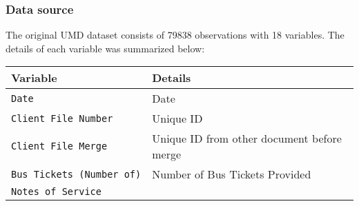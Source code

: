 \documentclass[]{article}
\begin{document}
\hypertarget{data-source}{%
\subsubsection{Data source}\label{data-source}}

The original UMD dataset consists of 79838 observations with 18
variables. The details of each variable was summarized below:

\begin{longtable}[]{@{}ll@{}}
\toprule
\begin{minipage}[b]{0.29\columnwidth}\raggedright
Variable\strut
\end{minipage} & \begin{minipage}[b]{0.65\columnwidth}\raggedright
Details\strut
\end{minipage}\tabularnewline
\midrule
\endhead
\begin{minipage}[t]{0.29\columnwidth}\raggedright
\texttt{Date}\strut
\end{minipage} & \begin{minipage}[t]{0.65\columnwidth}\raggedright
Date\strut
\end{minipage}\tabularnewline
\begin{minipage}[t]{0.29\columnwidth}\raggedright
\texttt{Client\ File\ Number}\strut
\end{minipage} & \begin{minipage}[t]{0.65\columnwidth}\raggedright
Unique ID\strut
\end{minipage}\tabularnewline
\begin{minipage}[t]{0.29\columnwidth}\raggedright
\texttt{Client\ File\ Merge}\strut
\end{minipage} & \begin{minipage}[t]{0.65\columnwidth}\raggedright
Unique ID from other document before merge\strut
\end{minipage}\tabularnewline
\begin{minipage}[t]{0.29\columnwidth}\raggedright
\texttt{Bus\ Tickets\ (Number\ of)}\strut
\end{minipage} & \begin{minipage}[t]{0.65\columnwidth}\raggedright
Number of Bus Tickets Provided\strut
\end{minipage}\tabularnewline
\begin{minipage}[t]{0.29\columnwidth}\raggedright
\texttt{Notes\ of\ Service}\strut
\end{minipage} & \begin{minipage}[t]{0.65\columnwidth}\raggedright

\end{minipage}
\end{longtable}
\end{document}
